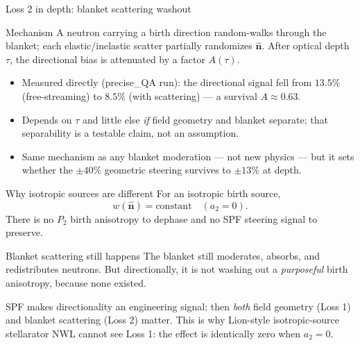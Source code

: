 \documentclass[aspectratio=169]{beamer}
\newcommand{\bn}{\hat{\bm n}}
\newcommand{\Ptwo}{P_2}
\begin{document}
\begin{frame}[t]{Loss 2 in depth: blanket scattering washout}
\begin{block}{Mechanism}
A neutron carrying a birth direction random-walks through the blanket; each elastic/inelastic scatter partially randomizes $\bn$. After optical depth $\tau$, the directional bias is attenuated by a factor $A(\tau)$.
\end{block}
\begin{itemize}
  \item Measured directly (precise\_QA run): the directional signal fell from $\mathbf{13.5\%}$ (free-streaming) to $\mathbf{8.5\%}$ (with scattering) --- a survival $A\approx\mathbf{0.63}$.
  \item Depends on $\tau$ and little else \emph{if} field geometry and blanket separate; that separability is a testable claim, not an assumption.
  \item Same mechanism as any blanket moderation --- not new physics --- but it sets whether the $\pm40\%$ geometric steering survives to $\pm13\%$ at depth.
\end{itemize}
\end{frame}

\begin{frame}[t]{Why isotropic sources are different}
For an isotropic birth source,
\[
w(\bn)=\text{constant} \quad (a_2=0).
\]
There is no $\Ptwo$ birth anisotropy to dephase and no SPF steering signal to preserve.
\vspace{0.5em}
\begin{block}{Blanket scattering still happens}
The blanket still moderates, absorbs, and redistributes neutrons. But directionally, it is not washing out a \emph{purposeful} birth anisotropy, because none existed.
\end{block}
SPF makes directionality an engineering signal; then \emph{both} field geometry (Loss 1) and blanket scattering (Loss 2) matter. This is why Lion-style isotropic-source stellarator NWL cannot see Loss 1: the effect is identically zero when $a_2=0$.
\end{frame}
\end{document}
